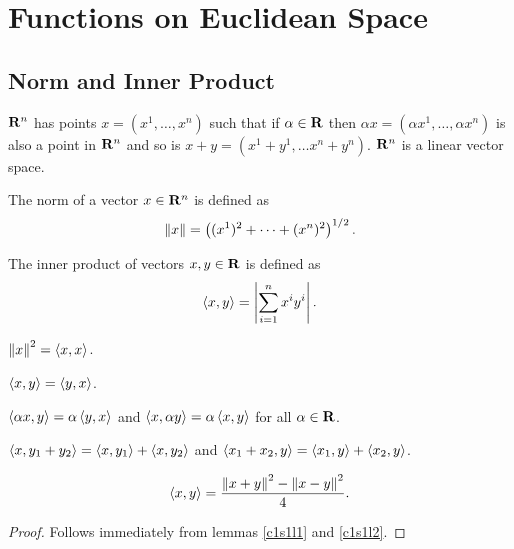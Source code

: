 \chapter{Functions on Euclidean Space}\label{c1}
\section{Norm and Inner Product}\label{c1s1}
$\mathbf{R}^n$ has points $x = (x^1, \ldots, x^n)$ such that if $\alpha \in \mathbf{R}$
then $\alpha x = (\alpha x^1, \ldots, \alpha x^n)$ is also a point in $\mathbf{R}^n$
and so is $x + y = (x^1 + y^1, \ldots x^n + y^n)$. $\mathbf{R}^n$ is a linear vector
space. 
\begin{defn}\label{c1s1d1}
The norm of a vector $x \in \mathbf{R}^n$ is defined as
\[
\left\Vert{x}\right\Vert = \left((x^1)^2 + \cdots + (x^n)^2\right)^{1/2}.
\]
\end{defn}

\begin{defn}\label{c1s1d2}
The inner product of vectors $x, y \in \mathbf{R}$ is defined as
\[
\left\langle{x, y}\right\rangle = \left\vert{\sum_{i=1}^n x^i y^i }\right\vert.
\]
\end{defn}

\begin{lem}\label{c1s1l1}
$\left\Vert{x}\right\Vert^2 = \left\langle{x, x}\right\rangle$.
\end{lem}

\begin{lem}\label{c1s1l2}
$\left\langle{x, y}\right\rangle = \left\langle{y, x}\right\rangle$.
\end{lem}

\begin{lem}\label{c1s1l3}
$\left\langle{\alpha x, y}\right\rangle = \alpha\left\langle{y, x}\right\rangle$ and $\left\langle{x, \alpha y}\right\rangle = \alpha\left\langle{x, y}\right\rangle$
for all $\alpha \in \mathbf{R}$.
\end{lem}

\begin{lem}\label{c1s1l4}
$\left\langle{x, y_1 + y_2}\right\rangle = \left\langle{x, y_1}\right\rangle + \left\langle{x, y_2}\right\rangle$ and $\left\langle{x_1 + x_2, y}\right\rangle = 
\left\langle{x_1, y}\right\rangle + \left\langle{x_2, y}\right\rangle$.
\end{lem}

\begin{lem}\label{c1s1l5}
\[
\left\langle{x, y}\right\rangle = \frac{\left\Vert{x + y}\right\Vert^2 - \left\Vert{x - y}\right\Vert^2}{4}.
\]
\end{lem}
\begin{proof}
Follows immediately from lemmas \ref{c1s1l1} and \ref{c1s1l2}.
\end{proof}

